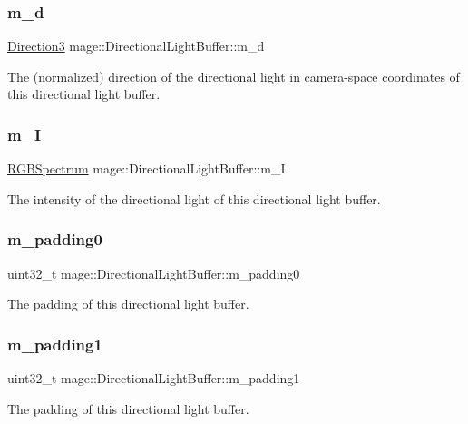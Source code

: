 \subsubsection{\texorpdfstring{m\+\_\+d}{m\_d}}
{\footnotesize\ttfamily \hyperlink{structmage_1_1_direction3}{Direction3} mage\+::\+Directional\+Light\+Buffer\+::m\+\_\+d}

The (normalized) direction of the directional light in camera-\/space coordinates of this directional light buffer. \hypertarget{structmage_1_1_directional_light_buffer_a357b86deb8ed2926cb77ed8191e967e6}{}\label{structmage_1_1_directional_light_buffer_a357b86deb8ed2926cb77ed8191e967e6} 
\subsubsection{\texorpdfstring{m\+\_\+I}{m\_I}}
{\footnotesize\ttfamily \hyperlink{structmage_1_1_r_g_b_spectrum}{R\+G\+B\+Spectrum} mage\+::\+Directional\+Light\+Buffer\+::m\+\_\+I}

The intensity of the directional light of this directional light buffer. \hypertarget{structmage_1_1_directional_light_buffer_af2e82dd3f47a965e009db19da9fb5167}{}\label{structmage_1_1_directional_light_buffer_af2e82dd3f47a965e009db19da9fb5167} 
\subsubsection{\texorpdfstring{m\+\_\+padding0}{m\_padding0}}
{\footnotesize\ttfamily uint32\+\_\+t mage\+::\+Directional\+Light\+Buffer\+::m\+\_\+padding0}

The padding of this directional light buffer. \hypertarget{structmage_1_1_directional_light_buffer_a81074641afb7ae296f7c6ee1b3fb12a2}{}\label{structmage_1_1_directional_light_buffer_a81074641afb7ae296f7c6ee1b3fb12a2} 
\subsubsection{\texorpdfstring{m\+\_\+padding1}{m\_padding1}}
{\footnotesize\ttfamily uint32\+\_\+t mage\+::\+Directional\+Light\+Buffer\+::m\+\_\+padding1}

The padding of this directional light buffer. 